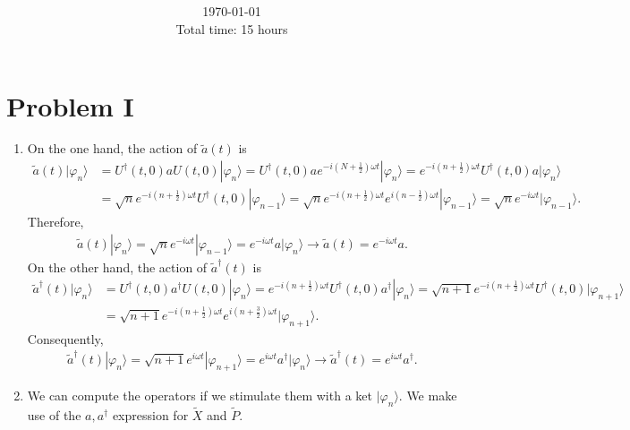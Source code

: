 \documentclass[letterpaper,11pt,twoside]{article}
\title{\textbf{\assignment}\\\course\\{\Large\institution}}
\author{\autor}
\date{\today\\Total time: 15 hours}
\newcommand{\ket}[1]{|#1\rangle}
\begin{document}
\pagestyle{mainstyle}
\maketitle
\section*{Problem I}
\begin{enumerate}[itemsep=0pt,topsep=0pt,label=\alph*)]
  \item On the one hand, the action of $\tilde{a}(t)$ is 
  \begin{align*}
    \tilde{a}(t)\ket{\varphi_n}&=U^\dagger(t,0)aU(t,0)\ket{\varphi_n}=U^\dagger(t,0)ae^{-i\left(N+\frac{1}{2}\right)\omega t}\ket{\varphi_n}=e^{-i\left(n+\frac{1}{2}\right)\omega t}U^\dagger(t,0)a\ket{\varphi_n}\\
    &=\sqrt{n}e^{-i\left(n+\frac{1}{2}\right)\omega t}U^\dagger(t,0)\ket{\varphi_{n-1}}=\sqrt{n}e^{-i\left(n+\frac{1}{2}\right)\omega t}e^{i\left(n-\frac{1}{2}\right)\omega t}\ket{\varphi_{n-1}}=\sqrt{n}e^{-i\omega t}\ket{\varphi_{n-1}}.
  \end{align*}
  Therefore,
  \begin{align*}
    \tilde{a}(t)\ket{\varphi_n}=\sqrt{n}e^{-i\omega t}\ket{\varphi_{n-1}}=e^{-i\omega t}a\ket{\varphi_n}\longrightarrow \tilde{a}(t)=e^{-i\omega t}a.
  \end{align*}
  On the other hand, the action of $\tilde{a}^\dagger(t)$ is 
  \begin{align*}
    \tilde{a}^\dagger(t)\ket{\varphi_n}&=U^\dagger(t,0)a^\dagger U(t,0)\ket{\varphi_n}=e^{-i\left(n+\frac{1}{2}\right)\omega t}U^\dagger(t,0)a^\dagger\ket{\varphi_n}=\sqrt{n+1}e^{-i\left(n+\frac{1}{2}\right)\omega t}U^\dagger(t,0)\ket{\varphi_{n+1}}\\
    &=\sqrt{n+1}e^{-i\left(n+\frac{1}{2}\right)\omega t}e^{i\left(n+\frac{3}{2}\right)\omega t}\ket{\varphi_{n+1}}.
  \end{align*}
  Consequently,
  \begin{align*}
    \tilde{a}^\dagger(t)\ket{\varphi_n}=\sqrt{n+1}e^{i\omega t}\ket{\varphi_{n+1}}=e^{i\omega t}a^\dagger\ket{\varphi_n}\longrightarrow \tilde{a}^\dagger(t)=e^{i\omega t}a^\dagger.
  \end{align*}
  \item We can compute the operators if we stimulate them with a ket $\ket{\varphi_n}$. We make use of the $a,a^\dagger$ expression for $\tilde{X}$ and $\tilde{P}$.
  \begin{align*}

\end{align*}
\end{enumerate}
\end{document}

